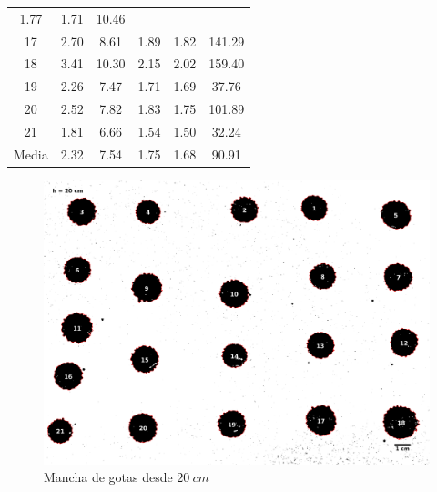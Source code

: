 \begin{table}[H]
\begin{tabular}{cccccc}
        1.77 & 1.71 & 10.46  \\ 17    & 2.70 & 8.61  & 1.89 & 1.82 & 141.29 \\
        18    & 3.41 & 10.30 & 2.15 & 2.02 & 159.40 \\ 19    & 2.26 & 7.47  &
        1.71 & 1.69 & 37.76  \\ 20    & 2.52 & 7.82  & 1.83 & 1.75 & 101.89 \\
        21    & 1.81 & 6.66  & 1.54 & 1.50 & 32.24  \\ \midrule Media & 2.32 &
        7.54  & 1.75 & 1.68 & 90.91  \\ \bottomrule \end{tabular} \end{table}

\begin{figure}[H] \centering
\includegraphics[width=0.75\linewidth]{src/20-1.png} \caption{Mancha de gotas
desde $20\ cm$} \label{fig:20cm-1} \end{figure}

